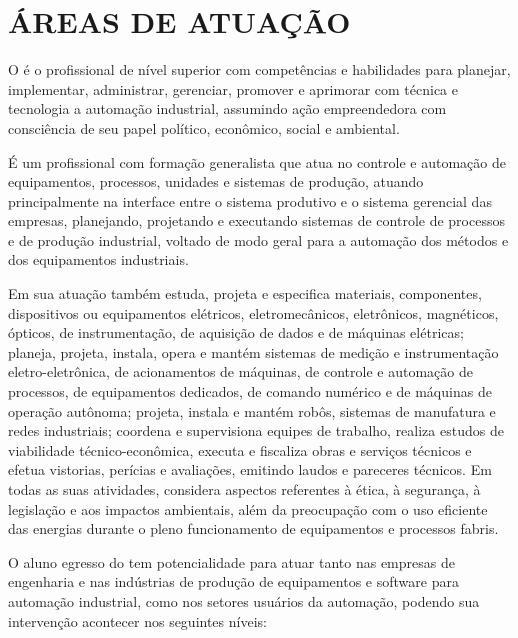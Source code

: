 
\clearpage\section{ÁREAS DE ATUAÇÃO}
O \NOMEEGRESSO é o profissional de nível superior com competências e
habilidades para planejar, implementar, administrar, gerenciar, promover e aprimorar com técnica e tecnologia a
automação industrial, assumindo ação empreendedora com consciência de seu papel político, econômico,
social e ambiental. 

É um profissional com formação generalista que atua no controle e automação de
equipamentos, processos, unidades e sistemas de produção, atuando principalmente na interface entre o sistema
produtivo e o sistema gerencial das empresas, planejando, projetando e executando sistemas de controle de processos e
de produção industrial, voltado de modo geral para a automação dos métodos e dos equipamentos industriais. 

Em sua atuação também estuda, projeta e especifica materiais, componentes, dispositivos ou equipamentos
elétricos, eletromecânicos, eletrônicos, magnéticos, ópticos, de instrumentação, de
aquisição de dados e de máquinas elétricas; planeja, projeta, instala, opera e mantém sistemas de
medição e instrumentação eletro-eletrônica, de acionamentos de máquinas, de controle e
automação de processos, de equipamentos dedicados, de comando numérico e de máquinas de
operação autônoma; projeta, instala e mantém robôs, sistemas de manufatura e redes industriais;
coordena e supervisiona equipes de trabalho, realiza estudos de viabilidade técnico-econômica, executa e
fiscaliza obras e serviços técnicos e efetua vistorias, perícias e avaliações, emitindo laudos
e pareceres técnicos. Em todas as suas atividades, considera aspectos referentes à ética, à
segurança, à legislação e aos impactos ambientais, além da preocupação com o uso eficiente das
energias durante o pleno funcionamento de equipamentos e processos fabris.

O aluno egresso do \NOMECURSO tem potencialidade para atuar tanto nas empresas de
engenharia e nas indústrias de produção de equipamentos e software para automação industrial, como nos setores usuários
da automação, podendo sua intervenção acontecer nos seguintes níveis:

